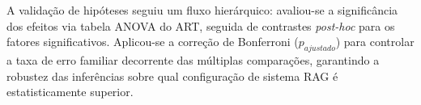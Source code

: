 A validação de hipóteses seguiu um fluxo hierárquico: avaliou-se a significância dos efeitos via tabela ANOVA do ART, seguida de contrastes \textit{post-hoc} para os fatores significativos. Aplicou-se a correção de Bonferroni ($p_{ajustado}$) para controlar a taxa de erro familiar decorrente das múltiplas comparações, garantindo a robustez das inferências sobre qual configuração de sistema RAG é estatisticamente superior.
